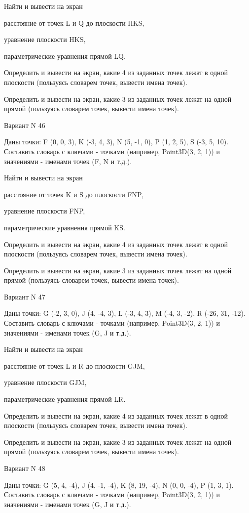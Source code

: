 \documentclass[11pt]{report}
\begin{document}
Найти и вывести на экран


расстояние от точек L и Q до плоскости HKS,


уравнение плоскости HKS,


параметрические уравнения прямой LQ.


Определить и вывести на экран, какие 4 из заданных точек лежат в одной плоскости (пользуясь словарем точек, вывести имена точек).


Определить и вывести на экран, какие 3 из заданных точек лежат на одной прямой (пользуясь словарем точек, вывести имена точек).

\newpage
Вариант N 46

Даны точки: F (0, 0, 3), K (-3, 4, 3), N (5, -1, 0), P (1, 2, 5), S (-3, 5, 10).
Составить словарь с ключами - точками (например, Point3D(3, 2, 1)) и значениями - именами точек (F, N и т.д.).


Найти и вывести на экран


расстояние от точек K и S до плоскости FNP,


уравнение плоскости FNP,


параметрические уравнения прямой KS.


Определить и вывести на экран, какие 4 из заданных точек лежат в одной плоскости (пользуясь словарем точек, вывести имена точек).


Определить и вывести на экран, какие 3 из заданных точек лежат на одной прямой (пользуясь словарем точек, вывести имена точек).

\newpage
Вариант N 47

Даны точки: G (-2, 3, 0), J (4, -4, 3), L (-3, 4, 3), M (-4, 3, -2), R (-26, 31, -12).
Составить словарь с ключами - точками (например, Point3D(3, 2, 1)) и значениями - именами точек (G, J и т.д.).


Найти и вывести на экран


расстояние от точек L и R до плоскости GJM,


уравнение плоскости GJM,


параметрические уравнения прямой LR.


Определить и вывести на экран, какие 4 из заданных точек лежат в одной плоскости (пользуясь словарем точек, вывести имена точек).


Определить и вывести на экран, какие 3 из заданных точек лежат на одной прямой (пользуясь словарем точек, вывести имена точек).

\newpage
Вариант N 48

Даны точки: G (5, 4, -4), J (4, -1, -4), K (8, 19, -4), N (0, 0, -4), P (1, 3, 1).
Составить словарь с ключами - точками (например, Point3D(3, 2, 1)) и значениями - именами точек (G, J и т.д.).
\end{document}

